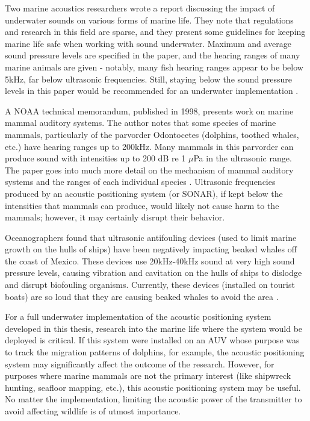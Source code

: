 \documentclass[12pt,a4paper]{report}
\begin{document}
Two marine acoustics researchers wrote a report discussing the impact of underwater sounds on various forms of marine life. They note that regulations and research in this field are sparse, and they present some guidelines for keeping marine life safe when working with sound underwater. Maximum and average sound pressure levels are specified in the paper, and the hearing ranges of many marine animals are given - notably, many fish hearing ranges appear to be below 5kHz, far below ultrasonic frequencies. Still, staying below the sound pressure levels in this paper would be recommended for an underwater implementation \cite{assessing}.

A NOAA technical memorandum, published in 1998, presents work on marine mammal auditory systems. The author notes that some species of marine mammals, particularly of the parvorder Odontocetes (dolphins, toothed whales, etc.) have hearing ranges up to 200kHz. Many mammals in this parvorder can produce sound with intensities up to 200 dB re 1 \(\mu\)Pa in the ultrasonic range. The paper goes into much more detail on the mechanism of mammal auditory systems and the ranges of each individual species \cite{implications}. Ultrasonic frequencies produced by an acoustic positioning system (or SONAR), if kept below the intensities that mammals can produce, would likely not cause harm to the mammals; however, it may certainly disrupt their behavior.

Oceanographers found that ultrasonic antifouling devices (used to limit marine growth on the hulls of ships) have been negatively impacting beaked whales off the coast of Mexico. These devices use 20kHz-40kHz sound at very high sound pressure levels, causing vibration and cavitation on the hulls of ships to dislodge and disrupt biofouling organisms. Currently, these devices (installed on tourist boats) are so loud that they are causing beaked whales to avoid the area \cite{cuvier}.

For a full underwater implementation of the acoustic positioning system developed in this thesis, research into the marine life where the system would be deployed is critical. If this system were installed on an AUV whose purpose was to track the migration patterns of dolphins, for example, the acoustic positioning system may significantly affect the outcome of the research. However, for purposes where marine mammals are not the primary interest (like shipwreck hunting, seafloor mapping, etc.), this acoustic positioning system may be useful. No matter the implementation, limiting the acoustic power of the transmitter to avoid affecting wildlife is of utmost importance.




\end{document}
